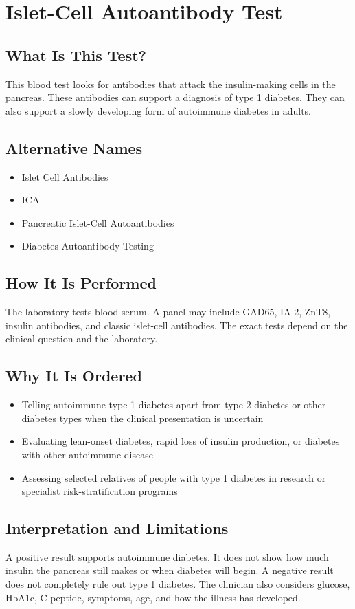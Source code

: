 \chapter{Islet-Cell Autoantibody Test}

\section*{What Is This Test?}
This blood test looks for antibodies that attack the insulin-making cells in the pancreas. These antibodies can support a diagnosis of type 1 diabetes. They can also support a slowly developing form of autoimmune diabetes in adults.

\section*{Alternative Names}
\begin{itemize}
  \item Islet Cell Antibodies
  \item ICA
  \item Pancreatic Islet-Cell Autoantibodies
  \item Diabetes Autoantibody Testing
\end{itemize}
\section*{How It Is Performed}
The laboratory tests blood serum. A panel may include GAD65, IA-2, ZnT8, insulin antibodies, and classic islet-cell antibodies. The exact tests depend on the clinical question and the laboratory.

\section*{Why It Is Ordered}
\begin{itemize}
  \item Telling autoimmune type 1 diabetes apart from type 2 diabetes or other diabetes types when the clinical presentation is uncertain
  \item Evaluating lean-onset diabetes, rapid loss of insulin production, or diabetes with other autoimmune disease
  \item Assessing selected relatives of people with type 1 diabetes in research or specialist risk-stratification programs
\end{itemize}

\section*{Interpretation and Limitations}
A positive result supports autoimmune diabetes. It does not show how much insulin the pancreas still makes or when diabetes will begin. A negative result does not completely rule out type 1 diabetes. The clinician also considers glucose, HbA1c, C-peptide, symptoms, age, and how the illness has developed.
